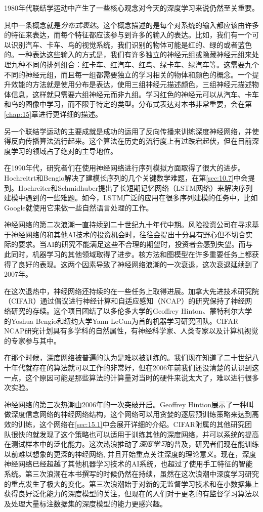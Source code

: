 1980年代联结学运动中产生了一些核心观念对今天的深度学习来说仍然至关重要。


其中一条概念就是\emph{分布式表达}。这个概念描述的是每个对系统的输入都应该由许多的特征来表达，而每个特征都应该参与到许多的输入的表达。比如，我们有一个可以识别汽车、卡车、鸟的视觉系统，我们识别的物体可能是红的、绿的或者蓝色的。一种表达这些输入的方式是，我们有许多独立的神经元组或隐藏神经元组来处理九种不同的排列组合：红卡车、红汽车、红鸟、绿卡车、绿汽车等。这需要九个不同的神经元组，而且每一组都需要独立的学习相关的物体和颜色的概念。一个提升效能的方法就是使用分布是表达，使用三组神经元描述颜色，三组神经元描述物体信息，这样就只需要六组神经元而非九组。学习红色的神经元可以从汽车、卡车和鸟的图像中学习，而不限于特定的类型。分布式表达对本书非常重要，会在第\ref{chap:15}章进行更详细的描述。


另一个联结学运动的主要成就是成功的运用了反向传播来训练深度神经网络，并使得反向传播算法流行起来。这个算法在历史的流行度上有过跌宕起伏，但在目前深度学习的领域占了绝对的主导地位。

在1990年代，研究者们在使用神经网络进行序列模拟方面取得了很大的进步。Hochreitrt和Bengio解决了建模长序列的几个关键数学难题，在第\ref{sec:10.7}中会提到。Hochreiter和Schmidhuber提出了长短期记忆网络（LSTM网络）来解决序列建模中遇到的一些难题。如今，LSTM广泛的应用在很多序列建模的任务中，比如Google就使用它来做一些自然语言处理的工作。


神经网络的第二次浪潮一直持续到二十世纪九十年代中期。风险投资公司在寻求基于神经网络的和其他AI技术的投资机会时，往往会提出十分具有野心但不切合实际的要求。当AI的研究不能满足这些不合理的期望时，投资者会感到失望。而与此同时，机器学习的其他领域取得了进步。核方法和图模型在许多重要任务上都获得了良好的表现。这两个因素导致了神经网络浪潮的一次衰退，这次衰退延续到了2007年。


在这次退热中，神经网络还持续的在一些任务上取得进展。加拿大先进技术研究院（CIFAR）通过倡议进行神经计算和自适应感知（NCAP）的研究保持了神经网络研究的存续。这个项目团结了以多伦多大学的Geoffrey Hinton、蒙特利尔大学的Yoshua Bengio和纽约大学Yann LeCun为首的机器学习研究团队。CIFAR NCAP研究计划具有多学科的自然属性，有神经科学家、人类专家以及计算机视觉的专家参与其中。


在那个时候，深度网络被普遍的认为是难以被训练的。我们现在知道了二十世纪八十年代就存在的算法就可以工作的非常好，但在2006年前我们还没清楚的认识到这一点，这个原因可能是那些算法的计算量对当时的硬件来说太大了，难以进行很多次实验。


神经网络的第三次热潮由2006年的一次突破开启。Geoffrey Hintion展示了一种叫做深度信念网络的神经网络结构，这个网络可以用贪婪的逐层预训练策略来达到高效的训练，这个网络在\ref{sec:15.1}中会展开详细的介绍。CIFAR附属的其他研究团队很快的就发现了这个策略也可以适用于训练其他的深度网络，并可以系统的提高在测试样本中的泛化能力。这次热浪推动了\emph{深度学习}的普及，研究者们现在能训练以前难以想象的更深的神经网络, 并且开始重点关注深度的理论意义。现在，深度神经网络已经超越了其他机器学习技术的AI系统，也超过了使用手工特征的智能系统。第三次浪潮在本书撰写的时候仍然在持续，虽然在这次浪潮中深度学习研究的重点发生了极大的变化。第三次浪潮始于对新的无监督学习技术和在小数据集上获得良好泛化能力的深度模型的关注，但现在的人们对于更老的有监督学习算法以及处理大量标注数据集的深度模型的能力更感兴趣。


